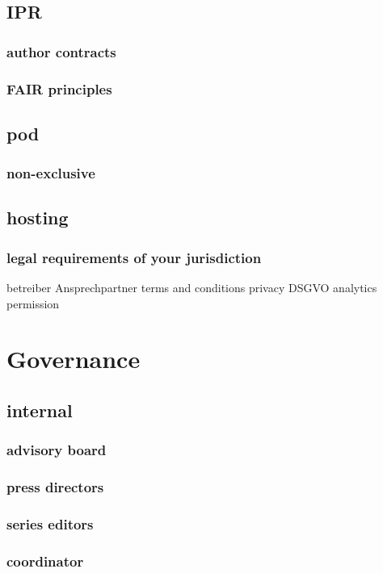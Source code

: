\documentclass[output=guidelines,guidelines] {langscibook}
\begin{document}
\subsection{IPR}
\subsubsection{author contracts}
\subsubsection{FAIR principles}
\subsection{pod}
\subsubsection{non-exclusive}
\subsection{hosting}
\subsubsection{legal requirements of your jurisdiction}
                    betreiber
                    Ansprechpartner
                    terms and conditions
                    privacy
                        DSGVO
                        analytics
                        permission
\section{Governance}
\subsection{internal}
\subsubsection{advisory board}
\subsubsection{press directors}
\subsubsection{series editors}
\subsubsection{coordinator}
\end{document}

